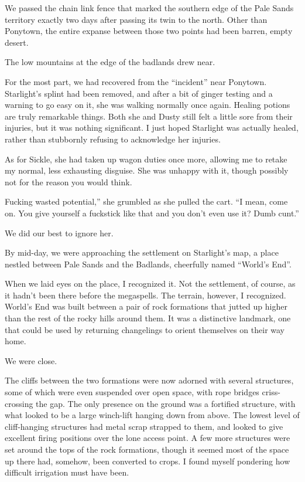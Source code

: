 We passed the chain link fence that marked the southern edge of the Pale Sands territory exactly two days after passing its twin to the north. Other than Ponytown, the entire expanse between those two points had been barren, empty desert.

The low mountains at the edge of the badlands drew near.

For the most part, we had recovered from the “incident” near Ponytown. Starlight’s splint had been removed, and after a bit of ginger testing and a warning to go easy on it, she was walking normally once again. Healing potions are truly remarkable things. Both she and Dusty still felt a little sore from their injuries, but it was nothing significant. I just hoped Starlight was actually healed, rather than stubbornly refusing to acknowledge her injuries.

As for Sickle, she had taken up wagon duties once more, allowing me to retake my normal, less exhausting disguise. She was unhappy with it, though possibly not for the reason you would think.

\leavevmode{}Fucking wasted potential,” she grumbled as she pulled the cart. “I mean, come on. You give yourself a fuckstick like that and you don’t even use it? Dumb cunt.”

We did our best to ignore her.

By mid-day, we were approaching the settlement on Starlight’s map, a place nestled between Pale Sands and the Badlands, cheerfully named “World’s End”.

When we laid eyes on the place, I recognized it. Not the settlement, of course, as it hadn’t been there before the megaspells. The terrain, however, I recognized. World’s End was built between a pair of rock formations that jutted up higher than the rest of the rocky hills around them. It was a distinctive landmark, one that could be used by returning changelings to orient themselves on their way home.

We were close.

The cliffs between the two formations were now adorned with several structures, some of which were even suspended over open space, with rope bridges criss-crossing the gap. The only presence on the ground was a fortified structure, with what looked to be a large winch-lift hanging down from above. The lowest level of cliff-hanging structures had metal scrap strapped to them, and looked to give excellent firing positions over the lone access point. A few more structures were set around the tops of the rock formations, though it seemed most of the space up there had, somehow, been converted to crops. I found myself pondering how difficult irrigation must have been.

